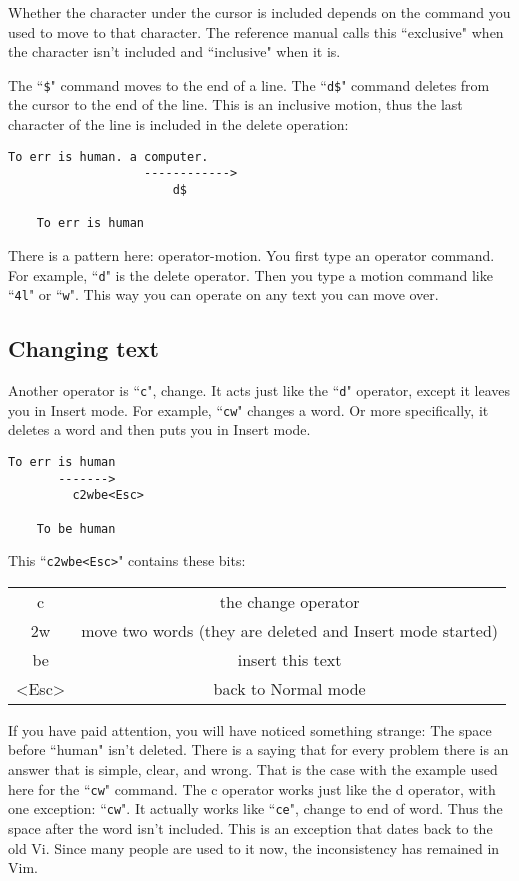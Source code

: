 Whether the character under the cursor is included depends on the command you used to move to that character.
The reference manual calls this ``exclusive" when the character isn't included and ``inclusive" when it is.

The ``\texttt{\$}" command moves to the end of a line.
The ``\texttt{d\$}" command deletes from the cursor to the end of the line.
This is an inclusive motion, thus the last character of the line is included in the delete operation:

\begin{Verbatim}[samepage=true]
    To err is human. a computer. 
                   ------------>
                       d$

    To err is human 
\end{Verbatim}

There is a pattern here: operator-motion.
You first type an operator command.
For example, ``\texttt{d}" is the delete operator.
Then you type a motion command like ``\texttt{4l}" or ``\texttt{w}".
This way you can operate on any text you can move over.

\subsection{Changing text}

Another operator is ``\texttt{c}", change.
It acts just like the ``\texttt{d}" operator, except it leaves you in Insert mode.
For example, ``\texttt{cw}" changes a word.
Or more specifically, it deletes a word and then puts you in Insert mode.

\begin{Verbatim}[samepage=true]
    To err is human 
       ------->
         c2wbe<Esc>

    To be human 
\end{Verbatim}

This ``\texttt{c2wbe<Esc>}" contains these bits:
\begin{center}
\begin{tabular}{c c}
				c & the change operator\\
				2w & move two words (they are deleted and Insert mode started)\\
				be & insert this text\\
				<Esc> & back to Normal mode\\
\end{tabular}
\end{center}

If you have paid attention, you will have noticed something strange: The space before ``human" isn't deleted.
There is a saying that for every problem there is an answer that is simple, clear, and wrong.
That is the case with the example used here for the ``\texttt{cw}" command.
The c operator works just like the d operator, with one exception: ``\texttt{cw}".
It actually works like ``\texttt{ce}", change to end of word.
Thus the space after the word isn't included.
This is an exception that dates back to the old Vi.
Since many people are used to it now, the inconsistency has remained in Vim.

